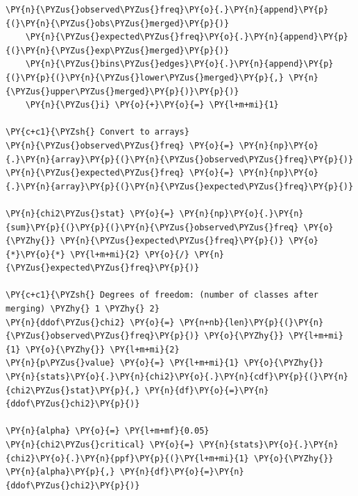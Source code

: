 \begin{tcolorbox}[breakable, size=fbox, boxrule=1pt, pad at break*=1mm,colback=cellbackground, colframe=cellborder]
\begin{Verbatim}[commandchars=\\\{\}]
    \PY{n}{\PYZus{}observed\PYZus{}freq}\PY{o}{.}\PY{n}{append}\PY{p}{(}\PY{n}{\PYZus{}obs\PYZus{}merged}\PY{p}{)}
    \PY{n}{\PYZus{}expected\PYZus{}freq}\PY{o}{.}\PY{n}{append}\PY{p}{(}\PY{n}{\PYZus{}exp\PYZus{}merged}\PY{p}{)}
    \PY{n}{\PYZus{}bins\PYZus{}edges}\PY{o}{.}\PY{n}{append}\PY{p}{(}\PY{p}{(}\PY{n}{\PYZus{}lower\PYZus{}merged}\PY{p}{,} \PY{n}{\PYZus{}upper\PYZus{}merged}\PY{p}{)}\PY{p}{)}
    \PY{n}{\PYZus{}i} \PY{o}{+}\PY{o}{=} \PY{l+m+mi}{1}

\PY{c+c1}{\PYZsh{} Convert to arrays}
\PY{n}{\PYZus{}observed\PYZus{}freq} \PY{o}{=} \PY{n}{np}\PY{o}{.}\PY{n}{array}\PY{p}{(}\PY{n}{\PYZus{}observed\PYZus{}freq}\PY{p}{)}
\PY{n}{\PYZus{}expected\PYZus{}freq} \PY{o}{=} \PY{n}{np}\PY{o}{.}\PY{n}{array}\PY{p}{(}\PY{n}{\PYZus{}expected\PYZus{}freq}\PY{p}{)}

\PY{n}{chi2\PYZus{}stat} \PY{o}{=} \PY{n}{np}\PY{o}{.}\PY{n}{sum}\PY{p}{(}\PY{p}{(}\PY{n}{\PYZus{}observed\PYZus{}freq} \PY{o}{\PYZhy{}} \PY{n}{\PYZus{}expected\PYZus{}freq}\PY{p}{)} \PY{o}{*}\PY{o}{*} \PY{l+m+mi}{2} \PY{o}{/} \PY{n}{\PYZus{}expected\PYZus{}freq}\PY{p}{)}

\PY{c+c1}{\PYZsh{} Degrees of freedom: (number of classes after merging) \PYZhy{} 1 \PYZhy{} 2}
\PY{n}{ddof\PYZus{}chi2} \PY{o}{=} \PY{n+nb}{len}\PY{p}{(}\PY{n}{\PYZus{}observed\PYZus{}freq}\PY{p}{)} \PY{o}{\PYZhy{}} \PY{l+m+mi}{1} \PY{o}{\PYZhy{}} \PY{l+m+mi}{2}
\PY{n}{p\PYZus{}value} \PY{o}{=} \PY{l+m+mi}{1} \PY{o}{\PYZhy{}} \PY{n}{stats}\PY{o}{.}\PY{n}{chi2}\PY{o}{.}\PY{n}{cdf}\PY{p}{(}\PY{n}{chi2\PYZus{}stat}\PY{p}{,} \PY{n}{df}\PY{o}{=}\PY{n}{ddof\PYZus{}chi2}\PY{p}{)}

\PY{n}{alpha} \PY{o}{=} \PY{l+m+mf}{0.05}
\PY{n}{chi2\PYZus{}critical} \PY{o}{=} \PY{n}{stats}\PY{o}{.}\PY{n}{chi2}\PY{o}{.}\PY{n}{ppf}\PY{p}{(}\PY{l+m+mi}{1} \PY{o}{\PYZhy{}} \PY{n}{alpha}\PY{p}{,} \PY{n}{df}\PY{o}{=}\PY{n}{ddof\PYZus{}chi2}\PY{p}{)}


\end{Verbatim}
\end{tcolorbox}
